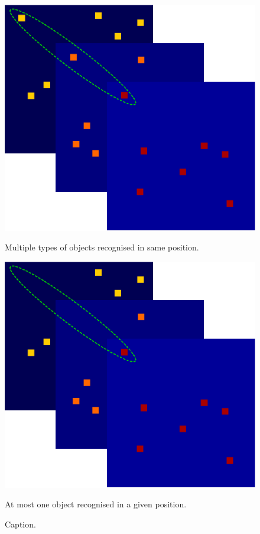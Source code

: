 \begin{figure}[h!]
\centering
\captionsetup{justification=centering}
\begin{multicols}{2}
    \includegraphics[scale=0.4]{figures/methods/winner_takes_all_object_on_every_filter.eps}
    \caption{Multiple types of objects recognised in same position.}
    \includegraphics[scale=0.4]{figures/methods/winner_takes_all_object_on_one_filter.eps}
    \caption{At most one object recognised in a given position.}
\end{multicols}
\caption{Caption.}
\label{fig:winner_takes_all_activations_on_layers}
\end{figure}


